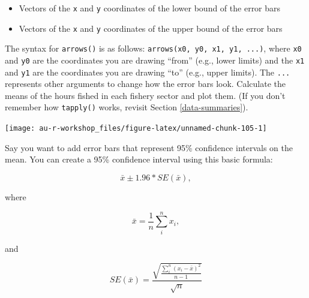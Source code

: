\documentclass[]{book}
\newenvironment{Shaded}{\begin{snugshade}}{\end{snugshade}}
\newcommand{\DataTypeTok}[1]{\textcolor[rgb]{0.13,0.29,0.53}{#1}}
\newcommand{\DecValTok}[1]{\textcolor[rgb]{0.00,0.00,0.81}{#1}}
\newcommand{\KeywordTok}[1]{\textcolor[rgb]{0.13,0.29,0.53}{\textbf{#1}}}
\newcommand{\NormalTok}[1]{#1}
\newcommand{\OperatorTok}[1]{\textcolor[rgb]{0.81,0.36,0.00}{\textbf{#1}}}
\newcommand{\StringTok}[1]{\textcolor[rgb]{0.31,0.60,0.02}{#1}}
\providecommand{\tightlist}{%
  \setlength{\itemsep}{0pt}\setlength{\parskip}{0pt}}
\begin{document}
\begin{itemize}
\tightlist
\item
  Vectors of the \texttt{x} and \texttt{y} coordinates of the lower bound of the error bars
\item
  Vectors of the \texttt{x} and \texttt{y} coordinates of the upper bound of the error bars
\end{itemize}

The syntax for \texttt{arrows()} is as follows: \texttt{arrows(x0,\ y0,\ x1,\ y1,\ ...)}, where \texttt{x0} and \texttt{y0} are the coordinates you are drawing ``from'' (e.g., lower limits) and the \texttt{x1} and \texttt{y1} are the coordinates you are drawing ``to'' (e.g., upper limits). The \texttt{...} represents other arguments to change how the error bars look. Calculate the means of the hours fished in each fishery sector and plot them. (If you don't remember how \texttt{tapply()} works, revisit Section \ref{data-summaries}).

\begin{Shaded}
\end{Shaded}

\begin{center}\texttt{[image: au-r-workshop\_files/figure-latex/unnamed-chunk-105-1]} \end{center}

Say you want to add error bars that represent 95\% confidence intervals on the mean. You can create a 95\% confidence interval using this basic formula:

\begin{equation}
  \bar{x} \pm 1.96 * SE(\bar{x}),
\label{eq:ci}
\end{equation}

where

\begin{equation}
  \bar{x}=\frac{1}{n}\sum_i^n{x_i},
\label{eq:ci-mean}
\end{equation}

and

\begin{equation}
  SE(\bar{x})=\frac{\sqrt{\frac{\sum_i^n{(x_i - \bar{x})^2}}{n-1}}}{\sqrt{n}}
\label{eq:ci-se}
\end{equation}
\end{document}
